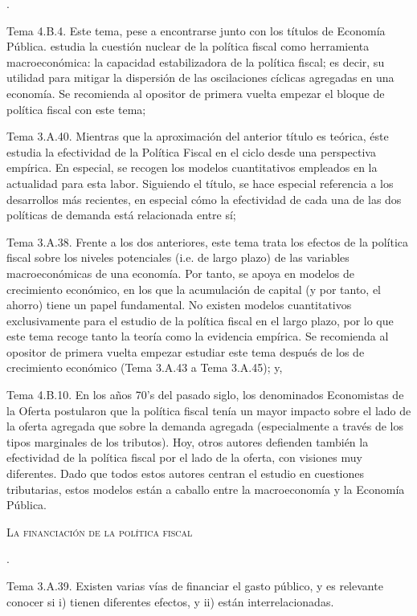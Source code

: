 \documentclass[10pt,a4paper]{article}
\newcounter{numitem}
\newenvironment{lnum}
      {\begin{list}{\arabic{numitem}.}{%
          \usecounter{numitem}%
          \setlength{\leftmargin}{1cm}%
          \setlength{\parskip}{3pt}%
          \setlength{\itemsep}{0pt}%
          \setlength{\parsep}{0pt}%
      }}
      {\end{list}}
\begin{document}
\begin{lnum}
    \item Tema 4.B.4. Este tema, pese a encontrarse junto con los títulos de Economía Pública. estudia la cuestión nuclear de la política fiscal como herramienta macroeconómica: la capacidad estabilizadora de la política fiscal; es decir, su utilidad para mitigar la dispersión de las oscilaciones cíclicas agregadas en una economía. Se recomienda al opositor de primera vuelta empezar el bloque de política fiscal con este tema;
    \item Tema 3.A.40. Mientras que la aproximación del anterior título es teórica, éste estudia la efectividad de la Política Fiscal en el ciclo desde una perspectiva empírica. En especial, se recogen los modelos cuantitativos empleados en la actualidad para esta labor. Siguiendo el título, se hace especial referencia a los desarrollos más recientes, en especial cómo la efectividad de cada una de las dos políticas de demanda está relacionada entre sí;
    \item Tema 3.A.38. Frente a los dos anteriores, este tema trata los efectos de la política fiscal sobre los niveles potenciales (i.e. de largo plazo) de las variables macroeconómicas de una economía. Por tanto, se apoya en modelos de crecimiento económico, en los que la acumulación de capital (y por tanto, el ahorro) tiene un papel fundamental. No existen modelos cuantitativos exclusivamente para el estudio de la política fiscal en el largo plazo, por lo que este tema recoge tanto la teoría como la evidencia empírica. Se recomienda al opositor de primera vuelta empezar estudiar este tema después de los de crecimiento económico (Tema 3.A.43 a Tema 3.A.45); y,
    \item Tema 4.B.10. En los años 70's del pasado siglo, los denominados Economistas de la Oferta postularon que la política fiscal tenía un mayor impacto sobre el lado de la oferta agregada que sobre la demanda agregada (especialmente a través de los tipos marginales de los tributos). Hoy, otros autores defienden también la efectividad de la política fiscal por el lado de la oferta, con visiones muy diferentes. Dado que todos estos autores centran el estudio en cuestiones tributarias, estos modelos están a caballo entre la macroeconomía y la Economía Pública.
\end{lnum}

\textsc{La financiación de la política fiscal}

\begin{lnum}
    \item Tema 3.A.39. Existen varias vías de financiar el gasto público, y es relevante conocer si i) tienen diferentes efectos, y ii) están interrelacionadas.
\end{lnum}
\end{document}
